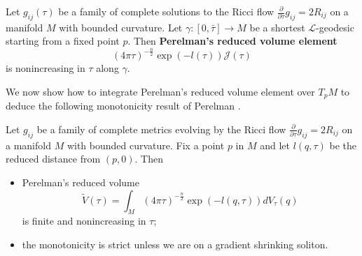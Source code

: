 \begin{theorem}
  \label{thm:cz-perelmans-reduced-jacobian-comparison}
Let $g_{ij}(\tau)$ be a family of complete solutions to the Ricci
flow $\frac{\partial}{\partial \tau}g_{ij}=2R_{ij}$ on a manifold
$M$ with bounded curvature. Let $\gamma:[0,\bar\tau]\rightarrow M$
be a shortest $\mathcal{L}$-geodesic starting from a fixed point
$p$. Then {\bf Perelman's reduced volume element}
$$
(4\pi\tau)^{-\frac{n}{2}}\exp(-l(\tau)){\mathcal{J}(\tau)}
$$
is nonincreasing in $\tau$ along $\gamma$.
\end{theorem}

We now show how to integrate Perelman's reduced volume element
over $T_pM$ to deduce the following monotonicity result of
Perelman \cite{P1}.

\begin{theorem}
  \label{thm:cz-monotonicity-of-reduced-volume}
Let $g_{ij}$ be a family of complete metrics evolving by the Ricci
flow $\frac{\partial}{\partial \tau}g_{ij}=2R_{ij}$ on a manifold
$M$ with bounded curvature. Fix a point $p$ in $M$ and let
$l(q,\tau)$ be the reduced distance from $(p,0)$. Then
\begin{itemize}
\item[(i)] Perelman's reduced volume
$$
\tilde{V}(\tau)
=\int_M(4\pi\tau)^{-\frac{n}{2}}\exp(-l(q,\tau))dV_{\tau}(q)
$$
is finite and nonincreasing in $\tau$; \item[(ii)] the
monotonicity is strict unless we are on a gradient shrinking
soliton.
\end{itemize}
\end{theorem}

